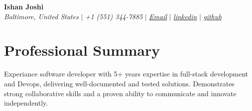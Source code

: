 \documentclass[letterpaper,10pt]{article}
\makeatletter
\newcommand{\sectionspace}{
\vspace{-20pt}
}
\newcommand{\subheadingtitlevspace}{
\vspace{-3pt}
}
\newcommand{\titleItem}[1]{
  \textbf{#1}
}
\newcommand{\resumeProjectHeading}[2]{
    \item
    \begin{tabular*}{0.97\textwidth}{l@{\extracolsep{\fill}}r}
      #1 & \textit{ #2} \\
    \end{tabular*}\vspace{-9pt}
}
\newcommand{\resumeSubHeadingListStart}{\subheadingtitlevspace\begin{itemize}[leftmargin=0.15in, label={}]}
\newcommand{\resumeSubHeadingListEnd}{\end{itemize}}
\makeatother
\begin{document}

\begin{flushleft}
    \textbf{\large Ishan Joshi} \\    
    \textit{Baltimore, United States} $|$ 
    \textit{+1 (551) 344-7885‬} $|$  
    \href{mailto:ishan.joshiapplication@gmail.com}{{\textit{Email}}} $|$ 
    \href{https://www.linkedin.com/in/ishanjoshi6286/}{{\textit{linkedin}}} $|$
    \href{https://123ishan.github.io/portfolio/}{{\textit{github}}}
    \vspace{-8pt}
\end{flushleft}


\section{Professional Summary}
\vspace{-3pt}
\begin{itemize}[leftmargin=0.15in, label={}]
    {\item{
     {Experiance software developer with 5+ years expertise in full-stack development and Devops, delivering well-documented and tested solutions. Demonstrates strong collaborative skills and a proven ability to communicate and innovate independently.} \\      
    }}
 \end{itemize}
 \sectionspace



\end{document}
